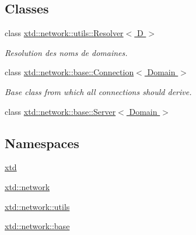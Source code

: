 \subsection*{Classes}
\begin{DoxyCompactItemize}
\item 
class \hyperlink{classxtd_1_1network_1_1utils_1_1Resolver}{xtd\-::network\-::utils\-::\-Resolver$<$ D $>$}
\begin{DoxyCompactList}\small\item\em Resolution des noms de domaines. \end{DoxyCompactList}\item 
class \hyperlink{classxtd_1_1network_1_1base_1_1Connection}{xtd\-::network\-::base\-::\-Connection$<$ Domain $>$}
\begin{DoxyCompactList}\small\item\em Base class from which all connections should derive. \end{DoxyCompactList}\item 
class \hyperlink{classxtd_1_1network_1_1base_1_1Server}{xtd\-::network\-::base\-::\-Server$<$ Domain $>$}
\end{DoxyCompactItemize}
\subsection*{Namespaces}
\begin{DoxyCompactItemize}
\item 
\hyperlink{namespacextd}{xtd}
\item 
\hyperlink{namespacextd_1_1network}{xtd\-::network}
\item 
\hyperlink{namespacextd_1_1network_1_1utils}{xtd\-::network\-::utils}
\item 
\hyperlink{namespacextd_1_1network_1_1base}{xtd\-::network\-::base}
\end{DoxyCompactItemize}
